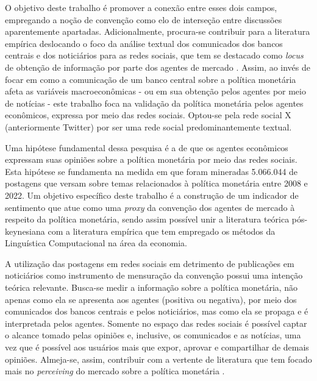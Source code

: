 O objetivo deste trabalho é promover a conexão entre esses dois campos, empregando a noção de convenção como elo de interseção entre discussões aparentemente apartadas. Adicionalmente, procura-se contribuir para a literatura empírica deslocando o foco da análise textual dos comunicados dos bancos centrais e dos noticiários para as redes sociais, que tem se destacado como \textit{locus} de obtenção de informação por parte dos agentes de mercado \parencite{paiva_essays_2022}. Assim, ao invés de focar em como a comunicação de um banco central sobre a política monetária afeta as variáveis macroeconômicas \parencite{lucca_measuring_2009, hansen_shocking_2016, shapiro_taking_2021, gardner_words_2021} - ou em sua obtenção pelos agentes por meio de notícias \parencite{picault_media_2022, de_oliveira_carosia_investment_2021, shapiro_measuring_2020, nyman_news_2021} -  este trabalho foca na validação da política monetária pelos agentes econômicos, expressa por meio das redes sociais. Optou-se pela rede social X (anteriormente Twitter) por ser uma rede social predominantemente textual.  

Uma hipótese fundamental dessa pesquisa é a de que os agentes econômicos expressam suas opiniões sobre a política monetária por meio das redes sociais. Esta hipótese se fundamenta na medida em que foram mineradas 5.066.044 de postagens que versam sobre temas relacionados à política monetária entre 2008 e 2022. Um objetivo específico deste trabalho é a construção de um indicador de sentimento que atue como uma \textit{proxy} da convenção dos agentes de mercado à respeito da política monetária, sendo assim possível unir a literatura teórica pós-keynesiana com a literatura empírica que tem empregado os métodos da Linguística Computacional na área da economia. 

A utilização das postagens em redes sociais em detrimento de publicações em noticiários como instrumento de mensuração da convenção possui uma intenção teórica relevante. Busca-se medir a informação sobre a política monetária, não apenas como ela se apresenta aos agentes (positiva ou negativa), por meio dos comunicados dos bancos centrais e pelos noticiários, mas como ela se propaga e é interpretada pelos agentes. Somente no espaço das redes sociais é possível captar o alcance tomado pelas opiniões e, inclusive, os comunicados e as notícias, uma vez que é possível aos usuários mais que expor, aprovar e compartilhar de demais opiniões. Almeja-se, assim, contribuir com a vertente de literatura que tem focado mais no \textit{perceiving} do mercado sobre a política monetária \parencite{hayo_self-monitoring_2015, picault_media_2022}. 

